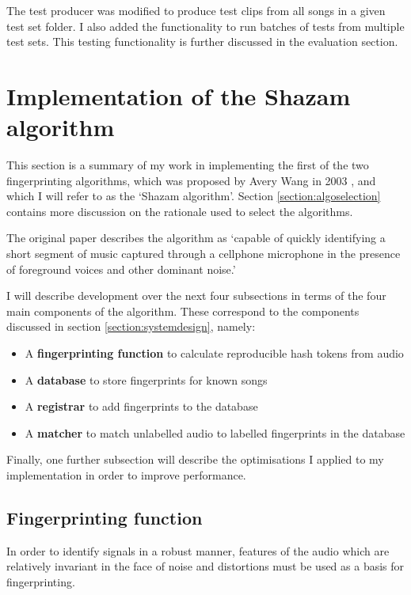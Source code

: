 \documentclass[12pt,a4paper,twoside,openright]{report}
\begin{document}
The test producer was modified to produce test clips from all songs in a given test set folder. I also added the functionality to run batches of tests from multiple test sets. This testing functionality is further discussed in the evaluation section. %



\section{Implementation of the Shazam algorithm}
\label{section:shazam}

This section is a summary of my work in implementing the first of the two fingerprinting algorithms, which was proposed by Avery Wang in 2003 \cite{Wang03}, and which I will refer to as the `Shazam algorithm'. Section \ref{section:algoselection} contains more discussion on the rationale used to select the algorithms.

The original paper describes the algorithm as `capable of quickly identifying a short segment of music captured through a cellphone microphone in the presence of foreground voices and other dominant noise.' %

I will describe development over the next four subsections in terms of the four main components of the algorithm. These correspond to the components discussed in section \ref{section:systemdesign}, namely: 

\begin{itemize}
  \item A \textbf{fingerprinting function} to calculate reproducible hash tokens from audio
  \item A \textbf{database} to store fingerprints for known songs
  \item A \textbf{registrar} to add fingerprints to the database
  \item A \textbf{matcher} to match unlabelled audio to labelled fingerprints in the database
\end{itemize}

Finally, one further subsection will describe the optimisations I applied to my implementation in order to improve performance.

\subsection{Fingerprinting function}

In order to identify signals in a robust manner, features of the audio which are relatively invariant in the face of noise and distortions must be used as a basis for fingerprinting.
\end{document}
